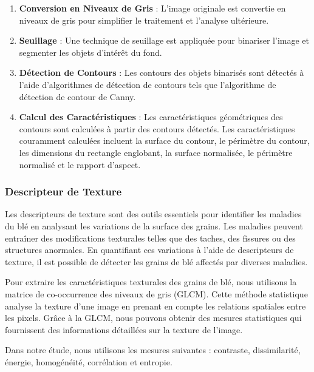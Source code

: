 \documentclass{article}
\begin{document}
	\begin{enumerate}
		\item \textbf{Conversion en Niveaux de Gris} : L'image originale est convertie en niveaux de gris pour simplifier le traitement et l'analyse ultérieure.
		
		\item \textbf{Seuillage} : Une technique de seuillage est appliquée pour binariser l'image et segmenter les objets d'intérêt du fond.
		
		\item \textbf{Détection de Contours} : Les contours des objets binarisés sont détectés à l'aide d'algorithmes de détection de contours tels que l'algorithme de détection de contour de Canny.
		
		\item \textbf{Calcul des Caractéristiques} : Les caractéristiques géométriques des contours sont calculées à partir des contours détectés. Les caractéristiques couramment calculées incluent la surface du contour, le périmètre du contour, les dimensions du rectangle englobant, la surface normalisée, le périmètre normalisé et le rapport d'aspect.
	\end{enumerate}
	
	\subsubsection{Descripteur de Texture}
	Les descripteurs de texture sont des outils essentiels pour identifier les maladies du blé en analysant les variations de la surface des grains. Les maladies peuvent entraîner des modifications texturales telles que des taches, des fissures ou des structures anormales. En quantifiant ces variations à l'aide de descripteurs de texture, il est possible de détecter les grains de blé affectés par diverses maladies.
	
	Pour extraire les caractéristiques texturales des grains de blé, nous utilisons la matrice de co-occurrence des niveaux de gris (GLCM). Cette méthode statistique analyse la texture d'une image en prenant en compte les relations spatiales entre les pixels. Grâce à la GLCM, nous pouvons obtenir des mesures statistiques qui fournissent des informations détaillées sur la texture de l'image.
	
	Dans notre étude, nous utilisons les mesures suivantes : contraste, dissimilarité, énergie, homogénéité, corrélation et entropie.
	
\end{document}
